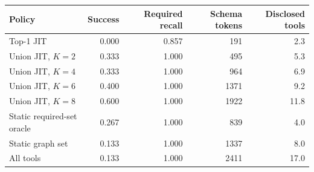 \begin{tabular}{lrrrr}
\toprule
Policy & Success & Required recall & Schema tokens & Disclosed tools \\
\midrule
Top-1 JIT & 0.000 & 0.857 & 191 & 2.3 \\
Union JIT, $K=2$ & 0.333 & 1.000 & 495 & 5.3 \\
Union JIT, $K=4$ & 0.333 & 1.000 & 964 & 6.9 \\
Union JIT, $K=6$ & 0.400 & 1.000 & 1371 & 9.2 \\
Union JIT, $K=8$ & 0.600 & 1.000 & 1922 & 11.8 \\
Static required-set oracle & 0.267 & 1.000 & 839 & 4.0 \\
Static graph set & 0.133 & 1.000 & 1337 & 8.0 \\
All tools & 0.133 & 1.000 & 2411 & 17.0 \\
\bottomrule
\end{tabular}

